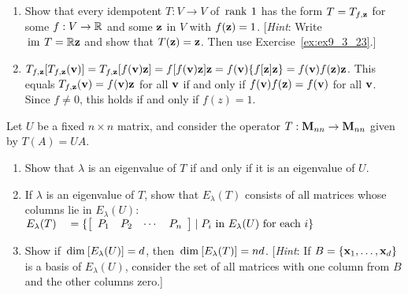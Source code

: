 \begin{multicols}{2}
\begin{ex}
\begin{enumerate}[label={\alph*.}]
\item Show that every idempotent $T : V \to V$ of $\thinspace\operatorname{rank \medspace}1$ has the form $T = T_{f,\textbf{z}}$ for some $f : V \to \mathbb{R}$ and some $\textbf{z}$ in $V$ with $f(\textbf{z}) = 1$. [\textit{Hint}: Write \\ $\thinspace\operatorname{im \medspace}T = \mathbb{R}\textbf{z}$ and show that $T(\textbf{z}) = \textbf{z}$. Then use Exercise~\ref{ex:ex9_3_23}.]

\end{enumerate}
\begin{sol}
\begin{enumerate}[label={\alph*.}]
\setcounter{enumi}{1}
\item $T_{f,\textbf{z}}[T_{f,\textbf{z}}(\textbf{v})] = T_{f,\textbf{z}}[f(\textbf{v})\textbf{z}] = f[f(\textbf{v})\textbf{z}]\textbf{z} = f(\textbf{v})\{f[\textbf{z}]\textbf{z}\} = f(\textbf{v})f(\textbf{z})\textbf{z}$. This equals $T_{f,\textbf{z}}(\textbf{v}) = f(\textbf{v})\textbf{z}$ for all $\textbf{v}$ if and only if $f(\textbf{v})f(\textbf{z}) = f(\textbf{v})$ for all $\textbf{v}$. Since $f \neq 0$, this holds if and only if $f(z) = 1$.

\end{enumerate}
\end{sol}
\end{ex}

\begin{ex}
Let $U$ be a fixed $n \times n$ matrix, and consider the operator $T : \textbf{M}_{nn} \to \textbf{M}_{nn}$ given by $T(A) = UA$.


\begin{enumerate}[label={\alph*.}]
\item Show that $\lambda$ is an eigenvalue of $T$ if and only if it is an eigenvalue of $U$.

\item If $\lambda$ is an eigenvalue of $T$, show that $E_{\lambda}(T)$ consists of all matrices whose columns lie in $E_{\lambda}(U)$: \\$E_{\lambda}(T) \\ \hspace*{1em}= \{ \left[ \begin{array}{cccc} P_1 & P_2 & \cdots & P_n \end{array} \right] \mid P_i \mbox{ in } E_{\lambda}(U) \mbox{ for each } i \}$

\item Show if $\thinspace\operatorname{dim\medspace}[E_{\lambda}(U)] = d$, then $\thinspace\operatorname{dim\medspace}[E_{\lambda}(T)] = nd$. [\textit{Hint}: If $B = \{\textbf{x}_{1}, \dots, \textbf{x}_{d}\}$ is a basis of $E_{\lambda}(U)$, consider the set of all matrices with one column from $B$ and the other columns zero.]


\end{enumerate}
\end{ex}
\end{multicols}
